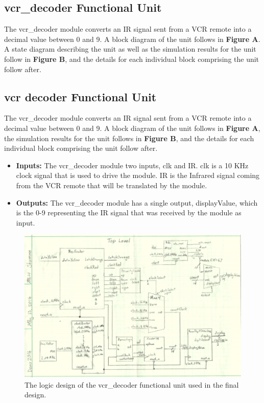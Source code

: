 \documentclass[a4paper]{article}
\begin{document}
\clearpage



\subsection{vcr\_decoder Functional Unit}
The vcr\_decoder module converts an IR signal sent from a VCR remote into a decimal value between 0 and 9. A block diagram of the unit follows in \textbf{Figure A}. A state diagram describing the unit as well as the simulation results for the unit follow in \textbf{Figure B}, and the details for each individual block comprising the unit follow after.
\subsection{vcr decoder Functional Unit}
The vcr\_decoder module converts an IR signal sent from a VCR remote into a decimal value between 0 and 9. A block diagram of the unit follows in \textbf{Figure A}, the simulation results for the unit follows in \textbf{Figure B}, and the details for each individual block comprising the unit follow after.
\begin{itemize}
  \item \textbf{Inputs:  } The vcr\_decoder module two inputs, clk and IR. clk is a 10 KHz clock signal that is used to drive the module. IR is the Infrared signal coming from the VCR remote that will be translated by the module.
  \item \textbf{Outputs: } The vcr\_decoder module has a single output, displayValue, which is the 0-9 representing the IR signal that was received by the module as input.
\end{itemize}
\begin{figure}[h]
  \centering
    \includegraphics[width=.8\textwidth]{images/functional_1.png}
	\caption{The logic design of the vcr\_decoder functional unit used in the final design.}
    \label{fig:functional-1}
\end{figure}
\end{document}

